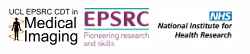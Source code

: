 \documentclass[10pt,xcolor=table]{beamer}
\begin{document}
\begin{frame}
\begin{small}
\begin{figure}
\centering
\includegraphics[height=1.0cm]{CDTlogo.png} \hspace{5em} \includegraphics[height=1.0cm]{epsrc_logo.jpg}\hspace{5em}\includegraphics[height=1.0cm]{brcLogo.jpg} 
   
\end{figure}


% 

\end{small}

\vspace{-2em}

\end{frame}

% 
% 
%  
 
 
\end{document}
